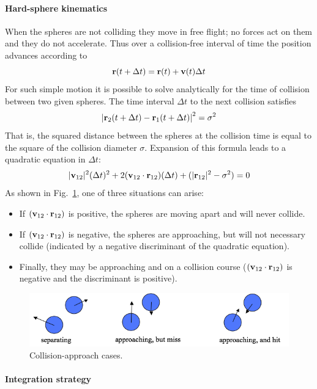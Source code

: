 \documentclass[]{article}
\let\oldparagraph\paragraph
\renewcommand{\paragraph}[1]{\oldparagraph{#1}\mbox{}}
\begin{document}
\paragraph{Hard-sphere kinematics}\label{hard-sphere-kinematics}

When the spheres are not colliding they move in free flight; no forces
act on them and they do not accelerate. Thus over a collision-free
interval of time the position advances according to
\[{\bf{r}}(t + \Delta t) = {\bf{r}}(t) + {\bf{v}}(t)\Delta t\]
For such simple motion it is possible to solve analytically for the time
of collision between two given spheres. The time interval $\Delta t$ to the next
collision satisfies
\[{\left| {{{\bf{r}}_2}(t + \Delta t) - {{\bf{r}}_1}(t + \Delta t)} \right|^2} = {\sigma ^2}\]
That is, the squared distance between the spheres at the collision time
is equal to the square of the collision diameter $\sigma$.
Expansion of this formula leads to
a quadratic equation in $\Delta t$:
\[|{{\bf{v}}_{12}}{|^2}{(\Delta t)^2} + 2({{\bf{v}}_{12}} \cdot {{\bf{r}}_{12}})(\Delta t) + (|{{\bf{r}}_{12}}{|^2} - {\sigma ^2}) = 0\]
As shown in Fig.~\ref{fig:approaches}, one of three situations can arise:

\begin{itemize}
\item If $({\bf v}_{12}\cdot {\bf r}_{12})$ is positive, the spheres are moving apart and will never collide. 
\item If $({\bf v}_{12}\cdot {\bf r}_{12})$ is negative, the spheres are approaching, but will not necessary collide
(indicated by a negative discriminant of the quadratic equation).
\item Finally, they may be approaching and on a collision course ($({\bf v}_{12}\cdot {\bf r}_{12})$ is negative
and the discriminant is positive).
\end{itemize}

\begin{figure}
  \centering
  \includegraphics[width=\textwidth]{HSMD_figures/image030}
  \caption{\label{fig:approaches}Collision-approach cases.}
\end{figure}


\paragraph{Integration strategy}\label{integration-strategy}
\end{document}
